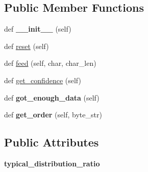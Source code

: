 \subsection*{Public Member Functions}
\begin{DoxyCompactItemize}
\item 
\mbox{\label{classchardet_1_1chardistribution_1_1_char_distribution_analysis_ae54b726dfef56ef5983e7b27352c41ac}} 
def {\bfseries \+\_\+\+\_\+init\+\_\+\+\_\+} (self)
\item 
def \hyperlink{classchardet_1_1chardistribution_1_1_char_distribution_analysis_a6f355660d4bc601766471b20d79dcee9}{reset} (self)
\item 
def \hyperlink{classchardet_1_1chardistribution_1_1_char_distribution_analysis_a406ad518b489485f9a21f2cce386cb7d}{feed} (self, char, char\+\_\+len)
\item 
def \hyperlink{classchardet_1_1chardistribution_1_1_char_distribution_analysis_a8b424ad3e45aaeb46e48a3e49ec5f535}{get\+\_\+confidence} (self)
\item 
\mbox{\label{classchardet_1_1chardistribution_1_1_char_distribution_analysis_aa54842185d6159787abe93f2c76a4c06}} 
def {\bfseries got\+\_\+enough\+\_\+data} (self)
\item 
\mbox{\label{classchardet_1_1chardistribution_1_1_char_distribution_analysis_a13812f625525c1c5f7b0637d437a65bc}} 
def {\bfseries get\+\_\+order} (self, byte\+\_\+str)
\end{DoxyCompactItemize}
\subsection*{Public Attributes}
\begin{DoxyCompactItemize}
\item 
\mbox{\label{classchardet_1_1chardistribution_1_1_char_distribution_analysis_a07d70edd94d24dfc1d32690f07c11905}} 
{\bfseries typical\+\_\+distribution\+\_\+ratio}
\end{DoxyCompactItemize}
